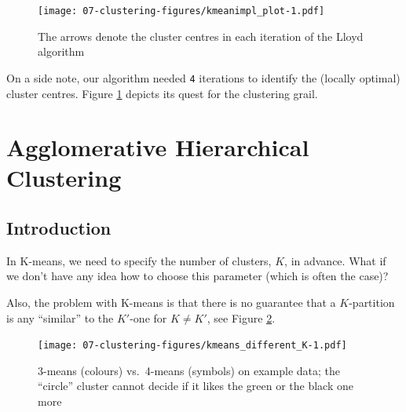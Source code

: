 \documentclass[10pt,b5paper,krantz1]{krantz}
\newenvironment{Shaded}{\begin{snugshade}}{\end{snugshade}}
\newcommand{\DataTypeTok}[1]{\textcolor[rgb]{0.27,0.27,0.27}{#1}}
\newcommand{\DecValTok}[1]{\textcolor[rgb]{0.06,0.06,0.06}{#1}}
\newcommand{\KeywordTok}[1]{\textcolor[rgb]{0.27,0.27,0.27}{\textbf{#1}}}
\newcommand{\NormalTok}[1]{#1}
\newcommand{\OperatorTok}[1]{\textcolor[rgb]{0.43,0.43,0.43}{\textbf{#1}}}
\newcommand{\StringTok}[1]{\textcolor[rgb]{0.5,0.5,0.5}{#1}}
\begin{document}
\begin{figure}
\hypertarget{fig:kmeanimpl_plot}{%
\centering
\texttt{[image: 07-clustering-figures/kmeanimpl\_plot-1.pdf]}
\caption{The arrows denote the cluster centres in each iteration of the Lloyd algorithm}\label{fig:kmeanimpl_plot}
}
\end{figure}

On a side note, our algorithm needed \texttt{4}
iterations to identify the (locally optimal) cluster centres.
Figure \ref{fig:kmeanimpl_plot} depicts its quest for the clustering grail.

\hypertarget{agglomerative-hierarchical-clustering}{%
\section{Agglomerative Hierarchical Clustering}\label{agglomerative-hierarchical-clustering}}

\hypertarget{introduction-13}{%
\subsection{Introduction}\label{introduction-13}}

In K-means, we need to specify the number of clusters, \(K\), in advance.
What if we don't have any idea how to choose this parameter (which is often
the case)?

Also, the problem with K-means is that there is no guarantee that a
\(K\)-partition is any ``similar'' to the \(K'\)-one for \(K\neq K'\),
see Figure \ref{fig:kmeans_different_K}.

\begin{Shaded}
\end{Shaded}

\begin{figure}
\hypertarget{fig:kmeans_different_K}{%
\centering
\texttt{[image: 07-clustering-figures/kmeans\_different\_K-1.pdf]}
\caption{3-means (colours) vs.~4-means (symbols) on example data; the ``circle'' cluster cannot decide if it likes the green or the black one more}\label{fig:kmeans_different_K}
}
\end{figure}
\end{document}
